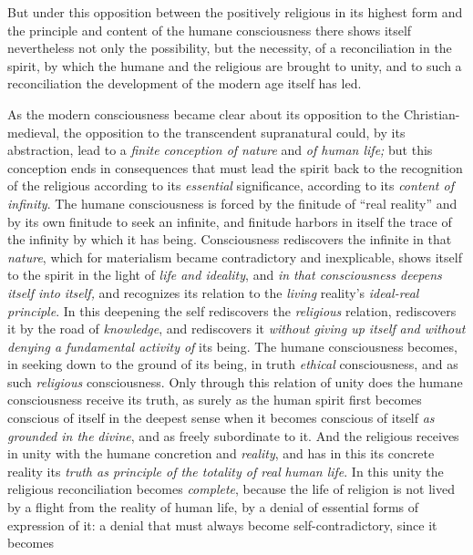 \documentclass[12pt,a4paper,openany]{book}
\newcommand{\opage}[1]{\marginnote{\footnotesize\textit{[#1]}}}
\begin{document}
But under this opposition between the positively religious in its highest form and the
principle and content of the humane consciousness there shows itself nevertheless not
only the possibility, but the necessity, of a reconciliation in the spirit, by which the
humane and the religious are brought to unity, and to such a reconciliation the
development of the modern age itself has led.

As the modern consciousness became clear about its opposition to the Christian-medieval,
the opposition to the transcendent supranatural could, by its abstraction, lead to a
\emph{finite conception of nature} and
\emph{of human life;} but this conception ends in consequences that must lead the spirit
back to the recognition of the religious according to its \emph{essential}
significance, according to its
\emph{content of infinity}. The humane consciousness
is forced by the finitude of ``real reality'' and by its own finitude to seek an
infinite, and finitude harbors in itself the trace of the infinity by which it has
being. Consciousness rediscovers the infinite in that \emph{nature},
which for materialism became contradictory and inexplicable,
shows itself to the spirit in the light of \emph{life and ideality}, and \emph{in that
consciousness deepens itself into}
\emph{itself,} and recognizes its relation to the \emph{living} reality's
\emph{ideal-real principle}. In this deepening
the self rediscovers the \emph{religious} relation, rediscovers it by the road of
\emph{knowledge}, and rediscovers it \emph{without giving up itself}
\emph{and without denying a fundamental activity of}
its being. The humane consciousness becomes, in seeking down to the ground of its
being, in truth \emph{ethical} consciousness, and as such \emph{religious}
consciousness. Only through this relation of unity does the humane consciousness
receive its truth, as surely as the human spirit first becomes conscious of itself in
the deepest sense when it becomes conscious of itself \emph{as grounded in the}
\setcounter{footnote}{0}%
\opage{218}\emph{divine}, and as freely subordinate to it. And the religious receives in unity
with the humane concretion and
\emph{reality}, and has in this its concrete reality
its \emph{truth as principle of the totality of real}
\emph{human life}. In this unity the religious reconciliation becomes \emph{complete},
because the life of religion is not lived by a flight from the reality of human life,
by a denial of essential forms of expression of it: a
denial that must always become self-contradictory, since it becomes
\end{document}
